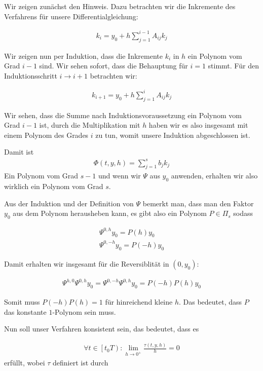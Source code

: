 \begin{solution}
  Wir zeigen zunächst den Hinweis. Dazu betrachten wir die Inkremente des Verfahrens
  für unsere Differentialgleichung:

  \begin{align*}
    k_i = y_0 + h \sum_{j=1}^{i-1}A_{ij}k_j
  \end{align*}

  Wir zeigen nun per Induktion, dass die Inkremente $k_i$ in $h$ ein Polynom vom Grad
  $i-1$ sind. Wir sehen sofort, dass die Behauptung für $i=1$ stimmt. Für den
  Induktionsschritt $i \rightarrow i+1$ betrachten wir:

  \begin{align*}
    k_{i+1} = y_0 + h \sum_{j=1}^iA_{ij}k_j
  \end{align*}

  Wir sehen, dass die Summe nach Induktionsvoraussetzung ein Polynom vom Grad
  $i-1$ ist, durch die Multiplikation mit $h$ haben wir es also insgesamt mit einem
  Polynom des Grades $i$ zu tun, womit unsere Induktion abgeschlossen ist.

  Damit ist
  \begin{align*}
    \Phi(t,y,h) = \sum_{j=1}^s b_j k_j
  \end{align*}
  Ein Polynom vom Grad $s-1$ und wenn wir $\Psi$ aus $y_{0}$ anwenden, erhalten wir also
  wirklich ein Polynom vom Grad $s$.

  Aus der Induktion und der Definition von $\Psi$ bemerkt man, dass man den Faktor
  $y_0$ aus dem Polynom herausheben kann, es gibt also ein Polynom $P \in \Pi_s$
  sodass

  \begin{align*}
    \Psi^{0,h} y_0 = P(h)y_0 \\
    \Psi^{0,-h} y_0 = P(-h)y_0
  \end{align*}

  Damit erhalten wir insgesamt für die Reversiblität in $(0,y_0)$:

  \begin{align*}
    \Psi^{h,0}\Psi^{0,h}y_0 = \Psi^{0,-h}\Psi^{0,h}y_0
    = P(-h)P(h)y_0
  \end{align*}

  Somit muss $P(-h)P(h) = 1$ für hinreichend kleine $h$. Das bedeutet, dass $P$
  das konstante $1$-Polynom sein muss.

  Nun soll unser Verfahren konsistent sein, das bedeutet, dass es

  \begin{align*}
    \forall t \in \left[t_0 T\right): \lim_{h\rightarrow 0^+}
    \frac{\tau(t,y,h)}{h} = 0
  \end{align*}
  erfüllt, wobei $\tau$ definiert ist durch


\end{solution}

